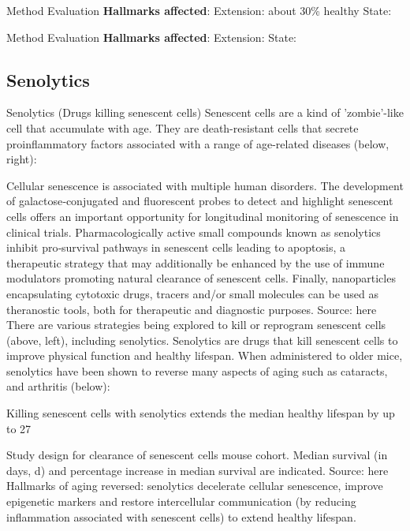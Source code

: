 \begin{frame}[c]{Method Evaluation}
    \textbf{Hallmarks affected}:
    \pause
    Extension: about 30\% healthy
    \pause
    State:
\end{frame}

\begin{frame}[c]{Method Evaluation}
    \textbf{Hallmarks affected}:
    \pause
    Extension:
    \pause
    State:
\end{frame}


\subsection{Senolytics}

\begin{frame}[c]{Senolytics (Drugs killing senescent cells)}
    Senescent cells are a kind of 'zombie'-like cell that accumulate with age. They are death-resistant cells that secrete proinflammatory factors associated with a range of age-related diseases (below, right):


Cellular senescence is associated with multiple human disorders. The development of galactose‐conjugated and fluorescent probes to detect and highlight senescent cells offers an important opportunity for longitudinal monitoring of senescence in clinical trials. Pharmacologically active small compounds known as senolytics inhibit pro‐survival pathways in senescent cells leading to apoptosis, a therapeutic strategy that may additionally be enhanced by the use of immune modulators promoting natural clearance of senescent cells. Finally, nanoparticles encapsulating cytotoxic drugs, tracers and/or small molecules can be used as theranostic tools, both for therapeutic and diagnostic purposes. Source: here
There are various strategies being explored to kill or reprogram senescent cells (above, left), including senolytics. Senolytics are drugs that kill senescent cells to improve physical function and healthy lifespan. When administered to older mice, senolytics have been shown to reverse many aspects of aging such as cataracts, and arthritis (below):


Killing senescent cells with senolytics extends the median healthy lifespan by up to 27%


Study design for clearance of senescent cells mouse cohort. Median survival (in days, d) and percentage increase in median survival are indicated. Source: here
Hallmarks of aging reversed: senolytics decelerate cellular senescence, improve epigenetic markers and restore intercellular communication (by reducing inflammation associated with senescent cells) to extend healthy lifespan.
\end{frame}


